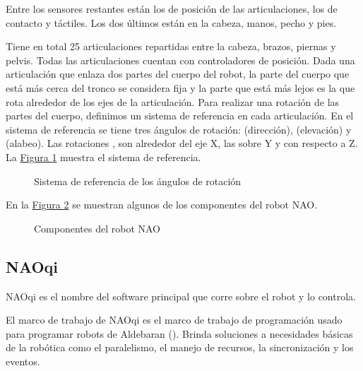Entre los sensores restantes están los de posición de las articulaciones, los
de contacto y táctiles. Los dos últimos están en la cabeza, manos, pecho y
pies.

Tiene en total 25 articulaciones repartidas entre la cabeza, brazos,
piernas y pelvis. Todas las articulaciones cuentan con controladores de posición.
Dada una articulación que enlaza dos partes del cuerpo del robot, la parte
del cuerpo que está más cerca del tronco se considera fija y la parte que está
más lejos  es la que rota alrededor de los ejes de la articulación.
Para realizar una rotación de las partes del cuerpo, definimos un sistema
de referencia en cada articulación.
En el sistema de referencia se tiene tres ángulos de rotación:
 (dirección),  (elevación) y  (alabeo).
Las rotaciones , son
alrededor del eje X, las   sobre Y y  con respecto a Z. La
\hyperref[\detokenize{chapter_one/naoqi:rollpitchyaw-frame}]{Figura \ref{\detokenize{chapter_one/naoqi:rollpitchyaw-frame}}} muestra el sistema de referencia.

\begin{figure}[htbp]
\centering
\capstart

\noindent{}
\caption{Sistema de referencia de los ángulos de rotación}\label{\detokenize{chapter_one/naoqi:rollpitchyaw-frame}}\end{figure}

En la \hyperref[\detokenize{chapter_one/naoqi:nao-config}]{Figura \ref{\detokenize{chapter_one/naoqi:nao-config}}} se muestran algunos de los componentes del robot NAO.

\begin{figure}[htbp]
\centering
\capstart

\noindent{}
\caption{Componentes del robot NAO}\label{\detokenize{chapter_one/naoqi:nao-config}}\end{figure}


\subsection{NAOqi}
\label{\detokenize{chapter_one/naoqi:naoqi}}
NAOqi es el nombre del software principal que corre sobre el robot y lo
controla.

El marco de trabajo de NAOqi es el marco de trabajo de programación
usado para programar robots de Aldebaran (). Brinda
soluciones a necesidades básicas de la robótica como el paralelismo, el manejo
de recursos, la sincronización y los eventos.



